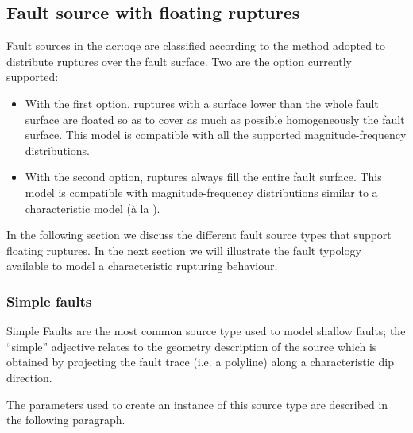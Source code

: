 \subsection{Fault source with floating ruptures}
%
Fault sources in the \gls{acr:oqe} are classified according to the method 
adopted to distribute ruptures over the fault surface.
Two are the option currently supported:
\begin{itemize}
    \item With the first option, ruptures with a surface lower than the 
		whole fault surface are floated so as to cover as much as 
		possible homogeneously the fault surface.
        This model is compatible with all the supported 
        magnitude-frequency distributions.
    \item With the second option, ruptures always fill the entire fault 
		surface. This model is 
        compatible  with magnitude-frequency distributions similar to a
        characteristic model (\`{a} la \cite{schwartz1984}).
\end{itemize}
In the following section we discuss the different fault source types 
that support floating ruptures.
In the next section we will illustrate the fault typology available to 
model a characteristic rupturing behaviour.
%
\subsubsection{Simple faults}
%
Simple Faults are the most common source type used to model shallow 
faults; the ``simple'' adjective relates to the geometry description 
of the source which is obtained by projecting the fault trace 
(i.e. a polyline) along a characteristic dip direction. 

The parameters used to create an instance of this 
source type are described in the following paragraph.
%
